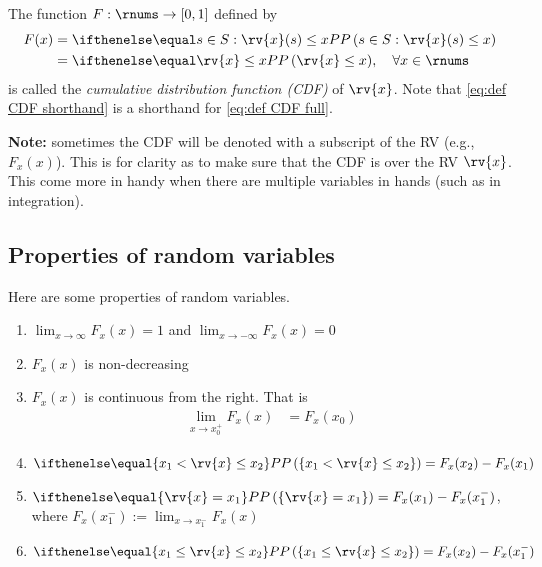\begin{mydefinition}
  The function $F : \rnums\to[0,1]$ defined by 
  \begin{align}
      F(x) 
      \label{eq:def CDF full}
      &= \prob{s\in S : \rv{x}(s)\leq x}\\
      \label{eq:def CDF shorthand}
      &= \prob{\rv{x}\leq x}, \quad \forall x\in\rnums
  \end{align}
  is called the \emph{cumulative distribution function (CDF)} of $\rv{x}$. Note that \eqref{eq:def CDF shorthand} is a shorthand for \eqref{eq:def CDF full}.

  \textbf{Note:} sometimes the CDF will be denoted with a subscript of the RV (e.g., $F_{x}(x)$). This is for clarity as to make sure that the CDF is over the RV $\rv{x}$. This come more in handy when there are multiple variables in hands (such as in integration).
\end{mydefinition}

\subsection{Properties of random variables}
Here are some properties of random variables.
\begin{enumerate}
    \item $\lim_{x\to\infty} F_{x}(x) =1$ and $\lim_{x\to-\infty} F_{x}(x)=0$
    \item $F_{x}(x)$ is non-decreasing 
    \item $F_{x}(x)$ is continuous from the right. That is
    \begin{align}
        \lim_{x\to x_{0}^{+}} F_{x}(x) &= F_{x}(x_{0})
    \end{align}
    \item $\prob{\left\{ x_{1}<\rv{x}\leq x_{2}\right\}}=F_{x}(x_{2})-F_{x}(x_{1})$
    \item $\prob{\left\{ \rv{x}=x_{1}\right\}}=F_{x}(x_{1})-F_{x}(x_{1}^{-})$, where $F_{x}(x_{1}^{-}):=\lim_{x\to x_{1}^{-}} F_{x}(x)$
    \item $\prob{\left\{ x_{1}\leq \rv{x} \leq x_{2}\right\}}=F_{x}(x_{2})-F_{x}(x_{1}^{-})$
\end{enumerate}

